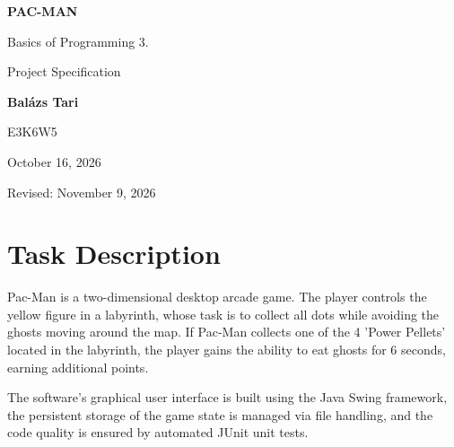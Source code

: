 \documentclass[11pt, a4paper]{article}
\begin{document}
\begin{titlepage}
    \centering
    \vspace*{4cm}
    {\Huge \textbf{PAC-MAN} \par}
    \vspace{1.5cm}
    {\LARGE Basics of Programming 3. \par}
    \vspace{0.5cm}
    {\Large Project Specification \par}
    
    \vspace{4.5cm}
    
    {\Large \textbf{Balázs Tari} \par}
    \vspace{0.3cm}
    {\Large E3K6W5 \par}
    
    \vfill
    
    {\large October 16, 2026 \par}
    \vspace{0.2cm}
    {\normalsize Revised: November 9, 2026 \par}
\end{titlepage}

\tableofcontents
\newpage

\section{Task Description}
Pac-Man is a two-dimensional desktop arcade game. The player controls the yellow figure in a labyrinth, whose task is to collect all dots while avoiding the ghosts moving around the map. If Pac-Man collects one of the 4 'Power Pellets' located in the labyrinth, the player gains the ability to eat ghosts for 6 seconds, earning additional points. 

The software's graphical user interface is built using the Java Swing framework, the persistent storage of the game state is managed via file handling, and the code quality is ensured by automated JUnit unit tests.

\end{document}
